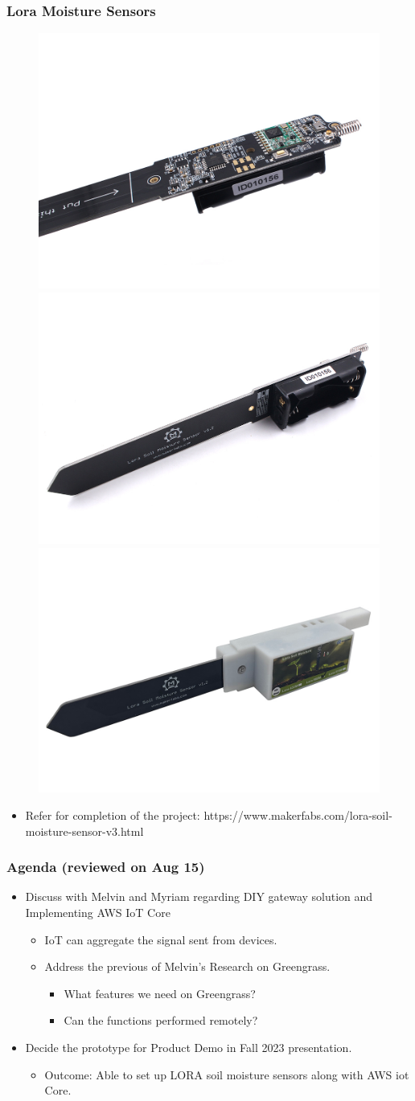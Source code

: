 \documentclass{beamer}
\begin{document}
\begin{frame}[t]
  \frametitle{Lora Moisture Sensors}
  \begin{figure}
      \includegraphics[width=.2\textwidth]{Lora-Soil-Moisture-V3-3-1000x750.jpg}
      \hfill 
      \includegraphics[width=.2\textwidth]{soil-moisture-sensors.png} 
      \hfill
      \includegraphics[width=.2\textwidth]{soil-moisture-sensors2.png}
      \hfill

    \end{figure} 

  \begin{itemize}
    \item Refer for completion of the project: https://www.makerfabs.com/lora-soil-moisture-sensor-v3.html 
  \end{itemize} 
\end{frame}

\begin{frame}[t]
 \frametitle{Agenda (reviewed on Aug 15)}
 \begin{itemize}
   \item Discuss with Melvin and Myriam regarding DIY gateway solution and Implementing AWS IoT Core
     \begin{itemize}
       \item IoT can aggregate the signal sent from devices. 
       \item Address the previous of Melvin's Research on Greengrass. 
	 \begin{itemize}
	   \item What features we need on Greengrass?
	   \item Can the functions performed remotely?
	 \end{itemize}
     \end{itemize}
   \item Decide the prototype for Product Demo in Fall 2023 presentation.
     \begin{itemize}
       \item Outcome: Able to set up LORA soil moisture sensors along with AWS iot Core.
     \end{itemize}
 \end{itemize} 
\end{frame}
\end{document}
